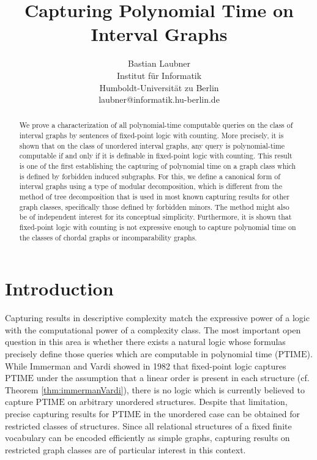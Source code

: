 \documentclass[10pt]{article}
\theoremstyle{remark}
\theoremstyle{definition}
\theoremstyle{plain}
\newcommand{\cclass}[1]{\ensuremath{\mathrm{#1}}\xspace}
\newcommand{\PTIME}{\cclass{PTIME}}
\begin{document}
\title{Capturing Polynomial Time on Interval Graphs}


\author{Bastian Laubner\\
  {\small Institut f\"ur Informatik}\\
  {\small Humboldt-Universit\"at zu Berlin}\\
  {\small laubner@informatik.hu-berlin.de}
}

\date{}


\maketitle

\begin{abstract}
  We prove a characterization of all polynomial-time computable queries on the class of interval graphs by sentences of fixed-point logic with counting. More precisely, it is shown that on the class of unordered interval graphs, any query is polynomial-time computable if and only if it is definable in fixed-point logic with counting. This result is one of the first establishing the capturing of polynomial time on a graph class which is defined by forbidden induced subgraphs. For this, we define a canonical form of interval graphs using a type of modular decomposition, which is different from the method of tree decomposition that is used in most known capturing results for other graph classes, specifically those defined by forbidden minors. The method might also be of independent interest for its conceptual simplicity. Furthermore, it is shown that fixed-point logic with counting is not expressive enough to capture polynomial time on the classes of chordal graphs or incomparability graphs.
\end{abstract}



\section{Introduction}\label{sec:intro}

Capturing results in descriptive complexity match the expressive power of a logic with the computational power of a complexity class. The most important open question in this area is whether there exists a natural logic whose formulas precisely define those queries which are computable in polynomial time (\PTIME). While Immerman and Vardi showed in 1982 that fixed-point logic captures \PTIME under the assumption that a linear order is present in each structure (cf. Theorem \ref{thm:immermanVardi}), there is no logic which is currently believed to capture \PTIME on arbitrary unordered structures. Despite that limitation, precise capturing results for \PTIME in the unordered case can be obtained for restricted classes of structures. Since all relational structures of a fixed finite vocabulary can be encoded efficiently as simple graphs, capturing results on restricted graph classes are of particular interest in this context.
\end{document}
